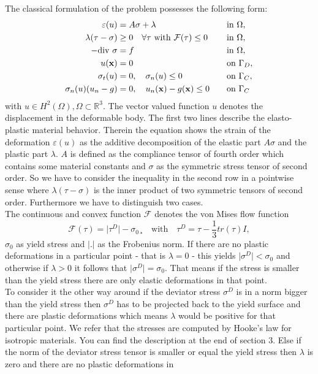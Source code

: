 \documentclass{article}
\begin{document}
The classical formulation of the problem possesses the following form:
\begin{align*}
 \varepsilon(u) &= A\sigma + \lambda & &\quad\text{in } \Omega,\\
 \lambda(\tau - \sigma) &\geq 0\quad\forall\tau\text{ with
 }\mathcal{F}(\tau)\leq 0 & &\quad\text{in } \Omega,\\
 -\textrm{\textrm{div}}\ \sigma &= f & &\quad\text{in } \Omega,\\
 u(\mathbf x) &= 0 & &\quad\text{on }\Gamma_D,\\
 \sigma_t(u) &= 0,\quad\sigma_n(u)\leq 0 & &\quad\text{on }\Gamma_C,\\
\sigma_n(u)(u_n - g) &= 0,\quad u_n(\mathbf x) - g(\mathbf x) \leq 0 & &\quad\text{on } \Gamma_C
\end{align*}
with $u\in H^2(\Omega),\Omega\subset\mathbb{R}^3$.  The vector valued
function $u$ denotes the displacement in the deformable body. The first two lines describe the
elasto-plastic material behavior. Therein the equation shows the
strain of the deformation $\varepsilon (u)$ as the additive decomposition of the
elastic part $A\sigma$ and the plastic part $\lambda$. $A$ is defined as the
compliance tensor of fourth order which contains some material constants and
$\sigma$ as the symmetric stress tensor of second order. So we have to consider
the inequality in the second row in a pointwise sense where $\lambda(\tau -
\sigma)$ is the inner product of two symmetric tensors of second order.
Furthermore we have to distinguish two cases.\\
The continuous and convex function $\mathcal{F}$ denotes the von Mises flow function
$$\mathcal{F}(\tau) = \vert\tau^D\vert - \sigma_0¸\quad\text{with}\quad \tau^D
= \tau - \dfrac{1}{3}tr(\tau)I,$$
$\sigma_0$ as yield stress and $\vert .\vert$ as the Frobenius norm. If there
are no plastic deformations in a particular point - that is $\lambda=0$ - this yields $\vert\sigma^D\vert <
\sigma_0$ and otherwise if $\lambda > 0$ it follows that $\vert\sigma^D\vert = \sigma_0$.
That means if the stress is smaller than the yield stress there are only elastic
deformations in that point.\\
To consider it the other way around if the deviator stress $\sigma^D$ is in a
norm bigger than the yield stress then $\sigma^D$ has to be projected back to the yield surface and there are plastic deformations which means $\lambda$
would be positive for that particular point. We refer that the stresses are
computed by Hooke's law for isotropic materials. You can find the description at the end of section 3. Else if the norm of the deviator stress tensor is smaller or equal the yield stress then $\lambda$ is zero and there are no plastic deformations in
\end{document}
